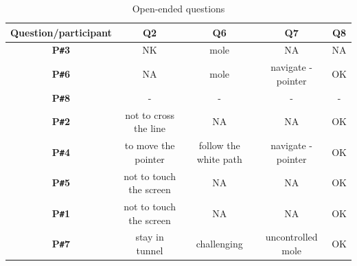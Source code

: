 \begin{table}[!ht]
    \centering
    \begin{tabular}{c|c|c|c|c}
    \hline
    \multicolumn{1}{|c|}{\textbf{Question/participant}} &
    \multicolumn{1}{c|}{\textbf{Q2}} &
    \multicolumn{1}{c|}{\textbf{Q6}} &
    \multicolumn{1}{c|}{\textbf{Q7}} &
    \multicolumn{1}{c|}{\textbf{Q8}} \\ \hline
    \multicolumn{1}{|c|}{\textbf{P\texttt{\#}3}} &
    \multicolumn{1}{c|}{NK} &
    \multicolumn{1}{c|}{mole} &
    \multicolumn{1}{c|}{NA} &
    \multicolumn{1}{c|}{NA} \\ \hline
    \multicolumn{1}{|c|}{\textbf{P\texttt{\#}6}} &
    \multicolumn{1}{c|}{NA} &
    \multicolumn{1}{c|}{mole} &
    \multicolumn{1}{c|}{navigate - pointer} &
    \multicolumn{1}{c|}{OK} \\ \hline
    \multicolumn{1}{|c|}{\textbf{P\texttt{\#}8}} &
    \multicolumn{1}{c|}{-} &
    \multicolumn{1}{c|}{-} &
    \multicolumn{1}{c|}{-} &
    \multicolumn{1}{c|}{-} \\ \hline
        \multicolumn{1}{|c|}{\textbf{P\texttt{\#}2}} &
    \multicolumn{1}{c|}{not to cross the line} &
    \multicolumn{1}{c|}{NA} &
    \multicolumn{1}{c|}{NA} &
    \multicolumn{1}{c|}{OK} \\ \hline
    \multicolumn{1}{|c|}{\textbf{P\texttt{\#}4}} &
    \multicolumn{1}{c|}{to move the pointer} &
    \multicolumn{1}{c|}{follow the white path} &
    \multicolumn{1}{c|}{navigate - pointer} &
    \multicolumn{1}{c|}{OK} \\ \hline
    \multicolumn{1}{|c|}{\textbf{P\texttt{\#}5}} &
    \multicolumn{1}{c|}{not to touch the screen} &
    \multicolumn{1}{c|}{NA} &
    \multicolumn{1}{c|}{NA} &
    \multicolumn{1}{c|}{OK} \\ \hline
       \multicolumn{1}{|c|}{\textbf{P\texttt{\#}1}} &
    \multicolumn{1}{c|}{not to touch the screen} &
    \multicolumn{1}{c|}{NA} &
    \multicolumn{1}{c|}{NA} &
    \multicolumn{1}{c|}{OK} \\ \hline
    \multicolumn{1}{|c|}{\textbf{P\texttt{\#}7}} &
    \multicolumn{1}{c|}{stay in tunnel} &
    \multicolumn{1}{c|}{challenging} &
    \multicolumn{1}{c|}{uncontrolled mole} &
    \multicolumn{1}{c|}{OK} \\ \hline
    \end{tabular}
    \caption{Open-ended questions}
    \label{tab:openendedquestion}
\end{table}





